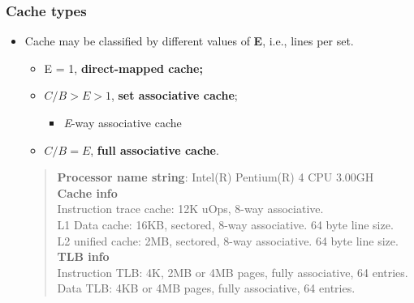 \documentclass[CJKutf8,xcolor=pdftex,dvipsnames,table]{beamer}
\begin{document}
\begin{CJK*}{UTF8}{song}
  \begin{frame}
    \frametitle{Cache types} \pause
    \begin{itemize}
    \item{Cache may be classified by different values of \textbf{E}, i.e., lines per set.} \pause
      \begin{itemize}
      \item{E = 1, \textbf{direct-mapped cache;}} \pause
      \item{$C/B>E>1$, \textbf{set associative cache};} \pause
        \begin{itemize}
        \item{\emph{E}-way associative cache} \pause
        \end{itemize}
      \item{$C/B=E$, \textbf{full associative cache}.} \pause
      \end{itemize}
      \begin{example}
        \begin{quote}
          \small
          \textbf{Processor name string}: Intel(R) Pentium(R) 4 CPU 3.00GH\\
          \textbf{Cache info}\\
          Instruction trace cache: 12K uOps, 8-way associative.\\
          L1 Data cache: 16KB, sectored, 8-way associative. 64 byte line size.\\
          L2 unified cache: 2MB, sectored, 8-way associative. 64 byte line size.\\
          \textbf{TLB info}\\
          Instruction TLB: 4K, 2MB or 4MB pages, fully associative, 64 entries.\\
          Data TLB: 4KB or 4MB pages, fully associative, 64 entries.\\
          \normalsize
        \end{quote}
      \end{example}
    \end{itemize}
  \end{frame}

\fi


\end{CJK*}
\end{document}
